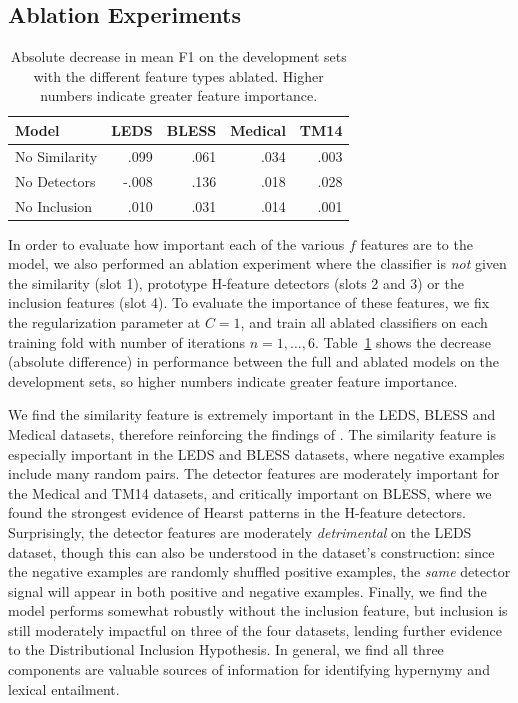 \subsection{Ablation Experiments}
\begin{table}
\centering
\begin{small}
\begin{tabular}{|l|rrrr|}
  \hline
  Model         &      LEDS   &      BLESS  &      Medical  &      TM14   \\
  \hline
  No Similarity &      .099   &      .061   &      .034     &      .003   \\
  No Detectors  &     -.008   &      .136   &      .018     &      .028   \\
  No Inclusion  &      .010   &      .031   &      .014     &      .001   \\
  \hline
\end{tabular}
\end{small}
\caption{Absolute decrease in mean F1 on the development sets with the
different feature types ablated. Higher numbers indicate greater feature
importance.}

\label{tab:ablation}
\end{table}

In order to evaluate how important each of the various $f$ features are to the
model, we also performed an ablation experiment where the classifier is {\em
not} given the similarity (slot 1), prototype H-feature detectors (slots 2 and
3) or the inclusion features (slot 4). To evaluate the importance of these
features, we fix the regularization parameter at $C = 1$, and train all
ablated classifiers on each training fold with number of iterations
$n = {1, \ldots, 6}$. Table~\ref{tab:ablation} shows the decrease (absolute difference) in performance
between the full and ablated models on the development sets, so higher numbers indicate greater
feature importance.

We find the similarity feature is extremely important in the LEDS, BLESS and
Medical datasets, therefore reinforcing the findings of
. The similarity feature is especially important in
the LEDS and BLESS datasets, where negative examples include many random
pairs. The detector features are moderately important for the Medical and TM14 datasets,
and critically important on BLESS, where we found the strongest evidence
of Hearst patterns in the H-feature detectors.
Surprisingly, the detector features are moderately {\em detrimental} on the
LEDS dataset, though this can also be understood in the dataset's construction:
since the negative examples are randomly shuffled positive examples, the
{\em same} detector signal will appear in both positive and negative examples.
Finally, we find the model performs somewhat robustly without the inclusion
feature, but inclusion is still moderately impactful on three of the four datasets,
lending further evidence to the Distributional Inclusion Hypothesis.
In general, we find all three components are valuable sources of information
for identifying hypernymy and lexical entailment.

